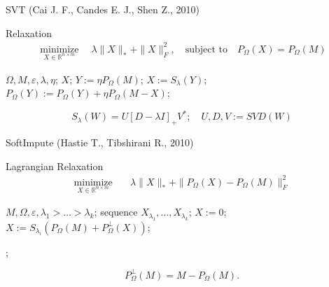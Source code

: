 \documentclass{beamer}
\begin{document}
\begin{frame}{SVT (Cai J. F., Candes E. J., Shen Z., 2010)}
		\begin{block}{Relaxation}
			\vspace{-0.5cm}
			\begin{align*}
			\mathop{\text{minimize}}\limits_{X \in \mathbb{R}^{n \times m}} \quad \lambda \| X \|_* + \| X \|_F^2, \quad
			\text{subject to} \quad P_{\Omega} (X) = P_{\Omega} (M)
			\end{align*}
		\end{block}
	\vspace{0.3cm}
	\begin{algorithmic}[1]
		\REQUIRE $\Omega, M, \varepsilon, \lambda, \eta$;
		\ENSURE $X$;
		\STATE $Y := \eta P_{\Omega}(M)$;
		\REPEAT
		\STATE $X := S_{\lambda} (Y)$;
		\STATE $P_{\Omega}\left(Y\right) := P_{\Omega}\left(Y\right)+\eta P_\Omega \left(M - X\right)$;
	\end{algorithmic}
	\vspace{0.3cm}
$$
S_{\lambda} (W) = U [D - \lambda I]_+ V^*; \quad U, D, V := SVD(W)
$$
\end{frame}
\begin{frame}{SoftImpute (Hastie T., Tibshirani R., 2010)}
		\begin{block}{Lagrangian Relaxation}
			\vspace{-0.5cm}
			\begin{align*}
			\mathop{\text{minimize}}\limits_{X \in \mathbb{R}^{n \times m}} \quad & 
			\lambda \| X \|_* + \|P_\Omega(X) - P_\Omega(M) \|_F^2
			\end{align*}
		\end{block}

\begin{algorithmic}[1]
	\REQUIRE $M, \Omega, \varepsilon, \lambda_1 > \dots > \lambda_k$;
	\ENSURE sequence $X_{\lambda_1}, \dots, X_{\lambda_k}$;
	\STATE $X := 0$;
	\REPEAT
	\STATE $X := S_{\lambda_i} (P_\Omega(M) + P_\Omega^\bot (X))$;
	
	;
	\ENDFOR
\end{algorithmic}
$$
	P_{\Omega}^\bot (M) = M - P_{\Omega} (M).
$$
\end{frame}
\end{document}
